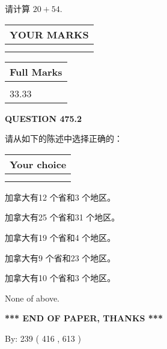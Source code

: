 \documentclass{ctexart}
\begin{document}
  
 
请计算 $ %
20 +  %
54 $.
 

 

 
  
\vspace{0.2in}
  
\noindent\begin{tabular}{|l|}
\hline
 YOUR MARKS  \\
\hline
 \\ 
 \\ 
\hline
\end{tabular}
\hspace{0.05in} \begin{tabular}{|l|}
\hline
 Full Marks  \\
\hline
 \\ 
33.33 \\
\hline
\end{tabular}
{\textbf{\Large{QUESTION
475.2 
}}}
  
  
请从如下的陈述中选择正确的：
  
  
\noindent\hspace{3.0in} \begin{tabular}{|l|}
\hline
Your choice \\
\hline
 \\ 
 \\ 
\hline
\end{tabular}
  
  
 
 
加拿大有12 个省和3 个地区。
 
 
加拿大有25 个省和31 个地区。
 
 
加拿大有19 个省和4 个地区。
 
 
加拿大有9 个省和23 个地区。
 
 
加拿大有10 个省和3 个地区。
 
 
 None of above.
 
 
   
   
 \vspace{0.2in}
 
   
   
   
   
\vspace{1.0in} 
{\textbf{\large{ *** END OF PAPER, THANKS *** }}} 
   
   
\hspace{1.0in} By: 
 239 ( 416 ,  613 )
   
\end{document}
